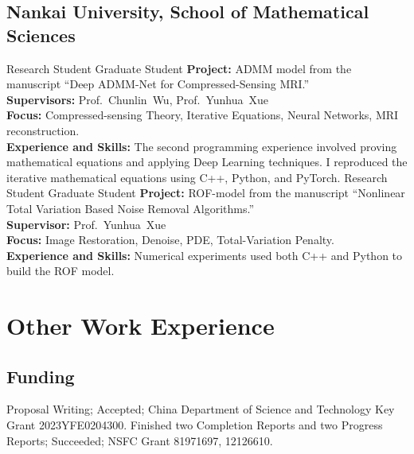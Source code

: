 \documentclass[11pt,a4paper, final]{moderncv}
\newcommand{\spacesection}{\vspace{0.4cm}}
\newcommand{\spacesubsection}{\vspace{0.2cm}}
\begin{document}
	\subsection{\textbf{Nankai University, School of Mathematical Sciences}}
		{Research Student}
		{}
		{}{Graduate Student}
		{\fontsize{11pt}{14} \selectfont 
		\textbf{Project: }
		ADMM model from the manuscript “Deep ADMM-Net for Compressed-Sensing MRI.”\\
		\textbf{Supervisors: }
		Prof.~Chunlin~Wu, Prof.~Yunhua~Xue\\
		\textbf{Focus: }
		Compressed-sensing Theory, Iterative Equations, Neural Networks, MRI reconstruction.\\
		\textbf{Experience and Skills: }
		The second programming experience involved proving mathematical equations and applying Deep Learning techniques. 
		I reproduced the iterative mathematical equations using C++, Python, and PyTorch.
		}
		{Research Student}
		{}
		{}{Graduate Student}
		{\fontsize{11pt}{14} \selectfont 
		\textbf{Project: }
		ROF-model from the manuscript “Nonlinear Total Variation Based Noise Removal Algorithms.”\\
		\textbf{Supervisor: }
		Prof.~Yunhua~Xue\\
		\textbf{Focus: }
		Image Restoration, Denoise, PDE, Total-Variation Penalty.\\
		\textbf{Experience and Skills: }
		Numerical experiments used both C++ and Python to build the ROF model.
		}
\section{\textbf{Other Work Experience}}
	\subsection{\textbf{Funding}}
		{Proposal Writing; Accepted; China Department of Science and Technology Key Grant 2023YFE0204300.}
		{Finished two Completion Reports and two Progress Reports; Succeeded; NSFC Grant 81971697, 12126610.}
\end{document}
